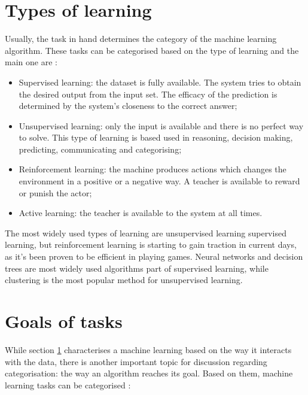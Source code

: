\section{Types of learning}
\label{sec:ml_types}

\qquad Usually, the task in hand determines the category of the machine learning algorithm. These tasks can be categorised based on the type of learning and the main one are \cite{modernapproach} \cite{new-advances-ml}:

\begin{itemize}
\item{Supervised learning: the dataset is fully available. The system tries to obtain the desired output from the input set. The efficacy of the prediction is determined by the system's closeness to the correct answer;}
\item{Unsupervised learning: only the input is available and there is no perfect way to solve. This type of learning is based used in reasoning, decision making, predicting, communicating and categorising;}
\item{Reinforcement learning: the machine produces actions which changes the environment in a positive or a negative way. A teacher is available to reward or punish the actor;}
\item{Active learning: the teacher is available to the system at all times.}
\end{itemize}

\qquad The most widely used types of learning are unsupervised learning supervised learning, but reinforcement learning is starting to gain traction in current days, as it's been proven to be efficient in playing games. Neural networks and decision trees are most widely used algorithms part of supervised learning, while clustering is the most popular method for unsupervised learning.

\section{Goals of tasks}
\label{sec:ml_goals}

\qquad While section \ref{sec:ml_types} characterises a machine learning based on the way it interacts with the data, there is another important topic for discussion regarding categorisation: the way an algorithm reaches its goal. Based on them, machine learning tasks can be categorised \cite{modernapproach}:

